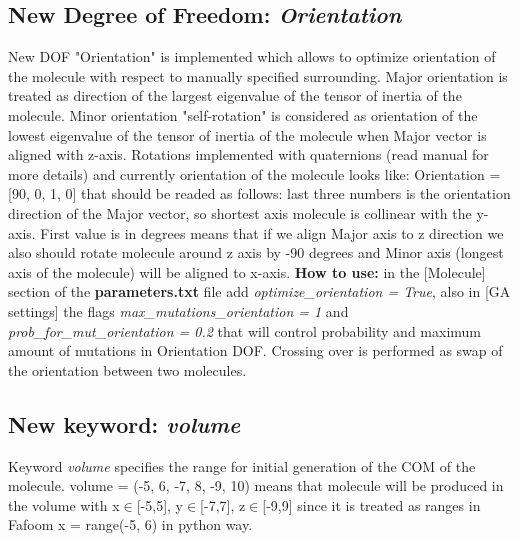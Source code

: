 \documentclass[a4paper]{article}
\begin{document}
\subsection{\textbf{New Degree of Freedom:} \textit{Orientation}} 
New DOF "Orientation" is implemented which allows to optimize orientation of the molecule with respect to manually specified surrounding. Major orientation is treated as direction of the largest eigenvalue of the tensor of inertia of the molecule. Minor orientation "self-rotation" is considered as orientation of the lowest eigenvalue of the tensor of inertia of the molecule when Major vector is aligned with z-axis. Rotations implemented with quaternions (read manual for more details) and currently orientation of the molecule looks like:
Orientation = [90, 0, 1, 0] that should be readed as follows:
last three numbers is the orientation direction of the Major vector, so shortest axis molecule is collinear with the y-axis. First value is in degrees means that if we align Major axis to z direction we also should rotate molecule around z axis by -90 degrees and Minor axis (longest axis of the molecule) will be aligned to x-axis. \newline
\textbf{How to use:}\newline
in the [Molecule] section of the \textbf{parameters.txt} file add \textit{optimize\_orientation = True}, also in [GA settings] the flags \textit{max\_mutations\_orientation = 1} and \textit{prob\_for\_mut\_orientation = 0.2} that will control probability and maximum amount of mutations in Orientation DOF. Crossing over is performed as swap of the orientation between two molecules.
\subsection{\textbf{New keyword:} \textit{volume}}
Keyword \textit{volume} specifies the range for initial generation of the COM of the molecule.
volume = (-5, 6, -7, 8, -9, 10) means that molecule will be produced in the volume with x$\in$[-5,5], y$\in$[-7,7], z$\in$[-9,9] since it is treated as ranges in Fafoom x = range(-5, 6) in python way.
\end{document}
